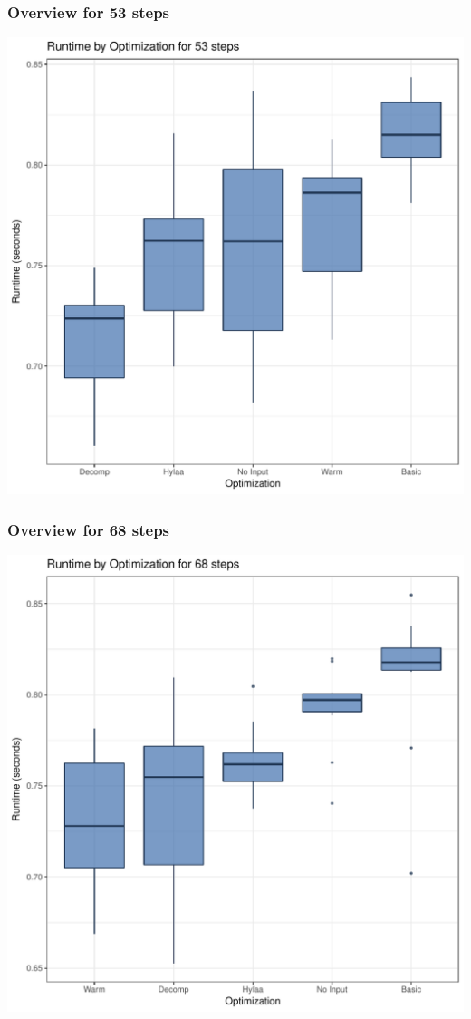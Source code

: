 \documentclass{article}\usepackage[]{graphicx}\usepackage[]{color}
\makeatletter
\def\maxwidth{ %
  \ifdim\Gin@nat@width>\linewidth
    \linewidth
  \else
    \Gin@nat@width
  \fi
}
\newenvironment{knitrout}{}{} %
\makeatother
\begin{document}
\subsubsection{Overview for 53 steps}
\begin{knitrout}
\color{fgcolor}
\includegraphics[width=\maxwidth]{figure/steps53-1} 

\end{knitrout}
\subsubsection{Overview for 68 steps}
\begin{knitrout}
\color{fgcolor}
\includegraphics[width=\maxwidth]{figure/steps68-1} 

\end{knitrout}
\end{document}
